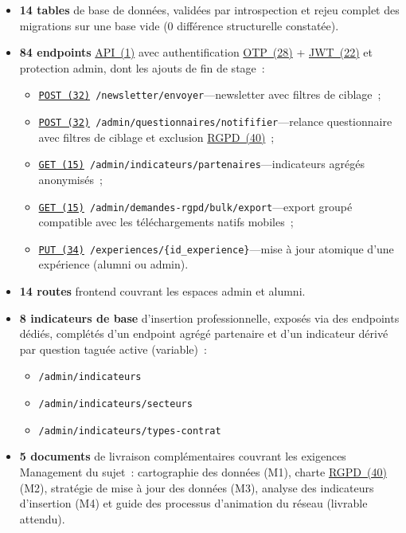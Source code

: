 \documentclass[12pt,a4paper]{report}
\begin{document}
\begin{itemize}
  \item \textbf{14 tables} de base de données, validées par introspection et rejeu complet des migrations sur une base vide (0 différence structurelle constatée).
  \item \textbf{84 endpoints} \hyperlink{abbr-API}{API~(1)} avec authentification \hyperlink{abbr-OTP}{OTP~(28)} + \hyperlink{abbr-JWT}{JWT~(22)} et protection admin, dont les ajouts de fin de stage~:
  \begin{itemize}
    \item \texttt{\hyperlink{abbr-POST}{POST~(32)} /newsletter/envoyer}---newsletter avec filtres de ciblage~;
    \item \texttt{\hyperlink{abbr-POST}{POST~(32)} /admin/questionnaires/notififier}---relance questionnaire avec filtres de ciblage et exclusion \hyperlink{abbr-RGPD}{RGPD~(40)}~;
    \item \texttt{\hyperlink{abbr-GET}{GET~(15)} /admin/indicateurs/partenaires}---indicateurs agrégés anonymisés~;
    \item \texttt{\hyperlink{abbr-GET}{GET~(15)} /admin/demandes-rgpd/bulk/export}---export groupé compatible avec les téléchargements natifs mobiles~;
    \item \texttt{\hyperlink{abbr-PUT}{PUT~(34)} /experiences/\{id\_experience\}}---mise à jour atomique d'une expérience (alumni ou admin).
  \end{itemize}
  \item \textbf{14 routes} frontend couvrant les espaces admin et alumni.
  \item \textbf{8 indicateurs de base} d'insertion professionnelle, exposés via des endpoints dédiés, complétés d'un endpoint agrégé partenaire et d'un indicateur dérivé par question taguée active (variable)~:
  \begin{itemize}
    \item \texttt{/admin/indicateurs}
    \item \texttt{/admin/indicateurs/secteurs}
    \item \texttt{/admin/indicateurs/types-contrat}
  \end{itemize}
  \item \textbf{5 documents} de livraison complémentaires couvrant les exigences \og{}Management\fg{} du sujet~: cartographie des données (M1), charte \hyperlink{abbr-RGPD}{RGPD~(40)} (M2), stratégie de mise à jour des données (M3), analyse des indicateurs d'insertion (M4) et guide des processus d'animation du réseau (livrable attendu).
\end{itemize}
\end{document}
